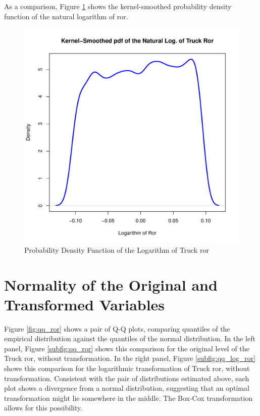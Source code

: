 \documentclass[11pt]{book}
\begin{document}
\pagebreak
As a comparison, Figure \ref{fig:density_log_ror} shows the kernel-smoothed probability density function of the natural logarithm of
ror.

\begin{figure}[h!]
  \centering
  \includegraphics[scale = 0.5, keepaspectratio=true]{../Figures/density_log_ror}
  \caption{Probability Density Function of the Logarithm of Truck ror} \label{fig:density_log_ror}
\end{figure}




\pagebreak
\section*{Normality of the Original and Transformed Variables}

Figure \ref{fig:qq_ror} shows a pair of Q-Q plots, 
comparing quantiles of the empirical distribution against
the quantiles of the normal distribution. 
In the left panel, Figure \ref{subfig:qq_ror} shows this comparison 
for the original level of the Truck ror, without transformation. 
In the right panel, Figure \ref{subfig:qq_log_ror} shows this comparison 
for the logarithmic transformation of Truck ror, without transformation. 
Consistent with the pair of distributions estimated above, 
each plot shows a divergence from a normal distribution,
suggesting that an optimal transformation might lie somewhere in the middle.
The Box-Cox transformation allows for this possibility. 
\end{document}
